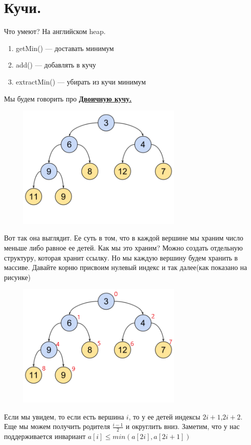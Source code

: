 \documentclass{article}
\newcommand{\deff}[1]{\underline{\textbf{#1}}}
\begin{document}
\pagebreak
 \section{Кучи.}
 Что умеют? На английском heap.
 \begin{enumerate}
     \item getMin() --- доставать минимум
     \item add() --- добавлять в кучу
     \item extractMin() --- убирать из кучи минимум
 \end{enumerate}
 Мы будем говорить про \deff{Двоичную кучу.}
 
 \includegraphics[width=10cm, height=6cm]{5.1.png}

 Вот так она выглядит. Ее суть в том, что  в каждой вершине мы храним число меньше либо равное ее детей. Как мы это храним? Можно создать отдельную структуру, которая хранит ссылку. Но мы каждую вершину будем хранить в массиве. Давайте корню присвоим нулевый индекс и так далее(как показано на рисунке)
 
  \includegraphics[width=10cm, height=6cm]{5.2.png}


Если мы увидем, то если есть вершина $i$, то у ее детей индексы $2i+1$,$2i+2$. Еще мы можем получить родителя $\frac{i-1}{2}$ и округлить вниз. Заметим, что у нас поддерживается инвариант $a[i]\leq min(a[2i],a[2i+1])$
\end{document}
